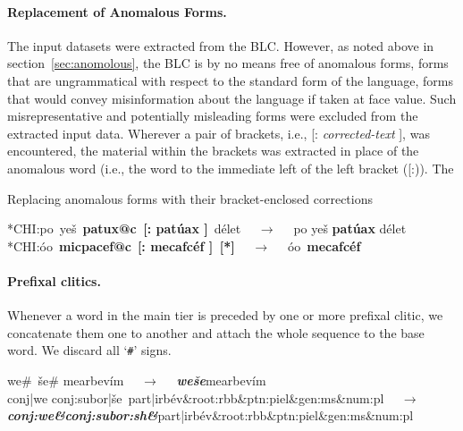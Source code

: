 \paragraph{Replacement of Anomalous Forms.} 
The input datasets were extracted from the \ac{BLC}. However, as noted above in 
section~\ref{sec:anomolous}, the \ac{BLC} is by no means free of anomalous forms, 
forms that are ungrammatical with respect to the standard form of the language, 
forms that would convey misinformation about the language if taken at face value. 
Such misrepresentative and potentially misleading forms were excluded from the 
extracted input data.  
Wherever a pair of brackets, i.e., \textsf{[: \textit{corrected-text} ]}, was encountered, 
the material within the brackets was extracted in place of the anomalous word (i.e., the 
word to the immediate left of the left bracket (\textsf{[:})). The 

\begin{exe}\label{ex:replace}
	\ex Replacing anomalous forms with their bracket-enclosed corrections
	\begin{xlist}
	   \ex \textsf{*CHI:}\quad\textsf{po\, ye\v{s}\, \textbf{patux@c\, [: pat\'{u}ax ]}\, d\'{e}let} $\quad\to\quad$
	   \textsf{po ye\v{s} \textbf{pat\'{u}ax} d\'{e}let}
	   \ex \textsf{*CHI:}\quad\textsf{\textglotstop\'{o}o\, \textbf{micpacef@c}\, \textbf{[: mecafc\'ef ]\, [*]}} $\quad\to\quad$ \textsf{\textglotstop\'oo\, \textbf{mecafc\'ef}}
	\end{xlist}
\end{exe} 

\paragraph{Prefixal clitics.}
Whenever a word in the main tier is preceded by one or more prefixal clitic, we concatenate them one to another and attach the whole sequence to the base word. We discard all `\texttt{\#}' signs.
\begin{exe}\label{ex:preclitics}
	\ex
	\textsf{we\#\, \v{s}e\# mearbev\'im} $\quad\to\quad$ \textbf{\textit{\textsf{we\v{s}e}}}\textsf{mearbev\'im}\\
	\textsf{conj|we conj:subor|\v{s}e\, part|irb\'ev\&root:rbb\&ptn:piel\&gen:ms\&num:pl} $\quad\to\quad$  \\
	\textit{\textbf{\textsf{conj:we\&conj:subor:sh\&}}}\textsf{part|irb\'ev\&root:rbb\&ptn:piel\&gen:ms\&num:pl}
\end{exe}

